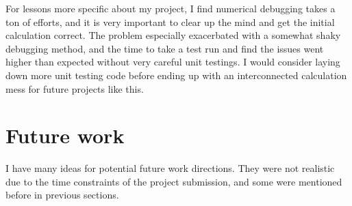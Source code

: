 \documentclass[12pt,a4paper,twoside,openright]{report}
\begin{document}
For lessons more specific about my project, I find numerical debugging takes a ton of efforts, and it is very important to clear up the mind and get the initial calculation correct. The problem especially exacerbated with a somewhat shaky debugging method, and the time to take a test run and find the issues went higher than expected without very careful unit testings. I would consider laying down more unit testing code before ending up with an interconnected calculation mess for future projects like this.

\section{Future work}

I have many ideas for potential future work directions. They were not realistic due to the time constraints of the project submission, and some were mentioned before in previous sections.
\end{document}
